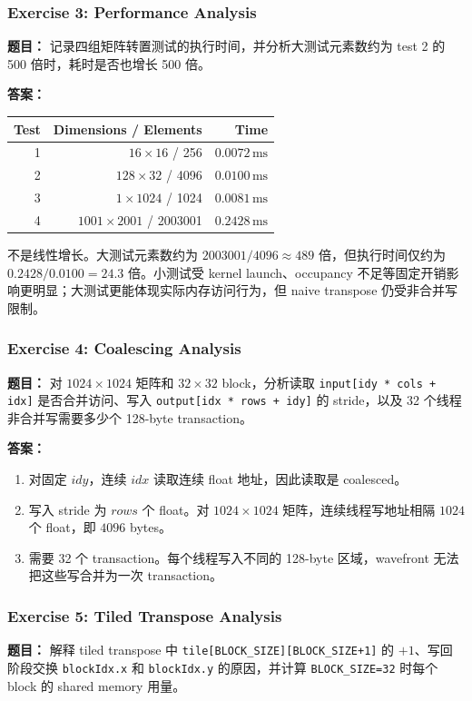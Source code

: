 \documentclass[10pt,a4paper]{article}
\begin{document}
\subsubsection{Exercise 3: Performance Analysis}
\noindent\textbf{题目：} 记录四组矩阵转置测试的执行时间，并分析大测试元素数约为 test 2 的 500 倍时，耗时是否也增长 500 倍。

\noindent\textbf{答案：}
\begin{center}
\small
\begin{tabular}{rrr}
\toprule
Test & Dimensions / Elements & Time \\
\midrule
1 & $16\times16$ / 256 & $0.0072\,\mathrm{ms}$ \\
2 & $128\times32$ / 4096 & $0.0100\,\mathrm{ms}$ \\
3 & $1\times1024$ / 1024 & $0.0081\,\mathrm{ms}$ \\
4 & $1001\times2001$ / 2003001 & $0.2428\,\mathrm{ms}$ \\
\bottomrule
\end{tabular}
\end{center}
不是线性增长。大测试元素数约为 $2003001/4096\approx489$ 倍，但执行时间仅约为 $0.2428/0.0100=24.3$ 倍。小测试受 kernel launch、occupancy 不足等固定开销影响更明显；大测试更能体现实际内存访问行为，但 naive transpose 仍受非合并写限制。

\subsubsection{Exercise 4: Coalescing Analysis}
\noindent\textbf{题目：} 对 $1024\times1024$ 矩阵和 $32\times32$ block，分析读取 \texttt{input[idy * cols + idx]} 是否合并访问、写入 \texttt{output[idx * rows + idy]} 的 stride，以及 32 个线程非合并写需要多少个 128-byte transaction。

\noindent\textbf{答案：}
\begin{enumerate}[label=\arabic*.]
\item 对固定 $idy$，连续 $idx$ 读取连续 float 地址，因此读取是 coalesced。
\item 写入 stride 为 $rows$ 个 float。对 $1024\times1024$ 矩阵，连续线程写地址相隔 $1024$ 个 float，即 $4096$ bytes。
\item 需要 32 个 transaction。每个线程写入不同的 128-byte 区域，wavefront 无法把这些写合并为一次 transaction。
\end{enumerate}

\subsubsection{Exercise 5: Tiled Transpose Analysis}
\noindent\textbf{题目：} 解释 tiled transpose 中 \texttt{tile[BLOCK\_SIZE][BLOCK\_SIZE+1]} 的 $+1$、写回阶段交换 \texttt{blockIdx.x} 和 \texttt{blockIdx.y} 的原因，并计算 \texttt{BLOCK\_SIZE=32} 时每个 block 的 shared memory 用量。
\end{document}
